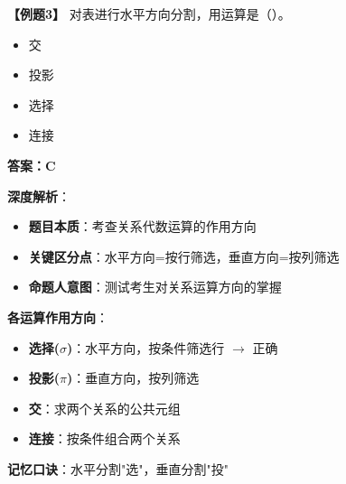 \documentclass[12pt, a4paper]{article}
\newenvironment{bluebox}[1]{%
  \begin{trivlist}
  \item[\hskip\labelsep \textbf{#1}]
  \setlength{\parskip}{0.5ex}
  \setlength{\itemsep}{0.5ex}
}{%
  \end{trivlist}
}
\begin{document}
\begin{bluebox}{例题3：关系运算判断}
	\textbf{【例题3】} 对表进行水平方向分割，用运算是（\quad）。

	\begin{itemize}
		\item[A)] 交
		\item[B)] 投影
		\item[C)] 选择
		\item[D)] 连接
	\end{itemize}

	\textbf{答案：C}

	\textbf{深度解析}：

	\begin{itemize}
		\item \textbf{题目本质}：考查关系代数运算的作用方向
		\item \textbf{关键区分点}：水平方向=按行筛选，垂直方向=按列筛选
		\item \textbf{命题人意图}：测试考生对关系运算方向的掌握
	\end{itemize}

	\textbf{各运算作用方向}：

	\begin{itemize}
		\item \textbf{选择($\sigma$)}：水平方向，按条件筛选行 $\rightarrow$ 正确
		\item \textbf{投影($\pi$)}：垂直方向，按列筛选
		\item \textbf{交}：求两个关系的公共元组
		\item \textbf{连接}：按条件组合两个关系
	\end{itemize}

	\textbf{记忆口诀}：水平分割"选"，垂直分割"投"
\end{bluebox}
\end{document}
